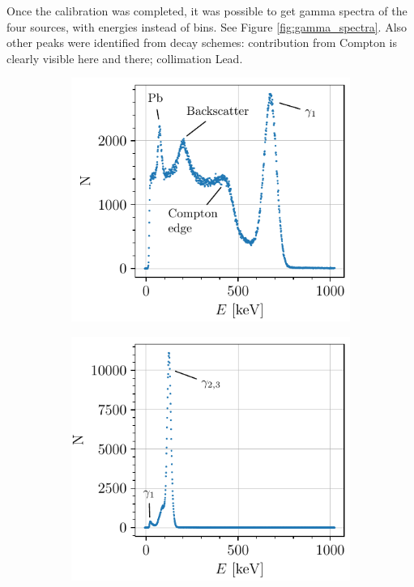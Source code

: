 Once the calibration was completed, it was possible to get gamma spectra of the four sources, with energies instead of bins.
See Figure \ref{fig:gamma_spectra}. Also other peaks were identified from decay schemes:
contribution from Compton is clearly visible here and there; collimation Lead.
\begin{figure}[htbp]
    \centering
    \begin{subfigure}{0.495\textwidth}
        \includegraphics[scale=1]{figures/cs137_spectrum.pdf}
        \caption{}
    \end{subfigure}
    \hfill
    \begin{subfigure}{0.495\textwidth}
        \includegraphics[scale=1]{figures/co57_spectrum.pdf}

\end{subfigure}
\end{figure}
